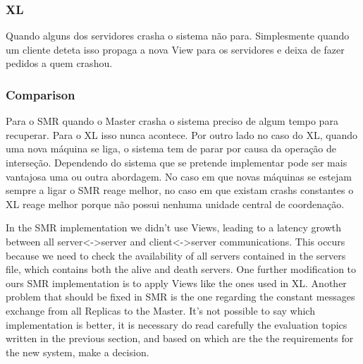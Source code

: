 \documentclass[times, 10pt,twocolumn]{article}
\begin{document}
\subsubsection{XL}

Quando alguns dos servidores crasha o sistema não para. Simplesmente quando um cliente deteta isso propaga a nova View para os servidores e 
deixa de fazer pedidos a quem crashou.

\subsubsection{Comparison}

Para o SMR quando o Master crasha o sistema preciso de algum tempo para recuperar. Para o XL isso nunca acontece. Por outro lado no caso do XL,
quando uma nova máquina se liga, o sistema tem de parar por causa da operação de interseção.
Dependendo do sistema que se pretende implementar pode ser mais vantajosa uma ou outra abordagem. No caso em que novas máquinas se estejam sempre
a ligar o SMR reage melhor, no caso em que existam crashs constantes o XL reage melhor porque não possui nenhuma unidade central de coordenação. 



In the SMR implementation we didn't use Views, leading to a latency growth between all server<->server and client<->server communications. 
This occurs because we need to check the availability of all servers contained in the servers file, which contains both the alive and death 
servers. One further modification to ours SMR implementation is to apply Views like the ones used in XL. 
Another problem that should be fixed in SMR is the one regarding the constant messages exchange from all Replicas to the Master.
It's not possible to say which implementation is better, it is necessary do read carefully the evaluation topics written in the previous section,
and based on which are the the requirements for the new system, make a decision.
\end{document}
